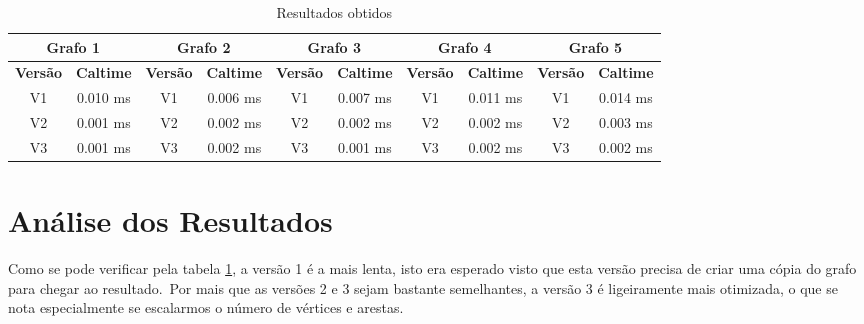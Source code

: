 \begin{table}[H]
    \centering
    \label{tab:resultados}
    \begin{tabular}{|c|c|c|c|c|c|c|c|c|c|}

        \hline
        \multicolumn{2}{|c|}{\textbf{Grafo 1}} & \multicolumn{2}{|c|}{\textbf{Grafo 2}} & \multicolumn{2}{|c|}{\textbf{Grafo 3}} & \multicolumn{2}{|c|}{\textbf{Grafo 4}} & \multicolumn{2}{|c|}{\textbf{Grafo 5}} \\
        \hline
        \textbf{Versão} & \textbf{Caltime} & \textbf{Versão} & \textbf{Caltime} & \textbf{Versão} & \textbf{Caltime} & \textbf{Versão} & \textbf{Caltime} & \textbf{Versão} & \textbf{Caltime} \\
        \hline
        V1 & 0.010 ms & V1 & 0.006 ms & V1 & 0.007 ms & V1 & 0.011 ms & V1 & 0.014 ms\\
        \hline
        V2 & 0.001 ms & V2 & 0.002 ms & V2 & 0.002 ms & V2 & 0.002 ms & V2 & 0.003 ms\\
        \hline
        V3 & 0.001 ms & V3 & 0.002 ms & V3 & 0.001 ms & V3 & 0.002 ms & V3 & 0.002 ms\\
        \hline

    \end{tabular}
    \caption{Resultados obtidos}
\end{table}

\section{Análise dos Resultados}
\label{sec:analise-experimental:analise-dos-resultados}

Como se pode verificar pela tabela \ref{tab:resultados}, a versão 1 é a mais lenta, isto era esperado visto que esta versão precisa de criar uma cópia do grafo para chegar ao resultado.\ Por mais que as versões 2 e 3 sejam bastante semelhantes, a versão 3 é ligeiramente mais otimizada, o que se nota especialmente se escalarmos o número de vértices e arestas.